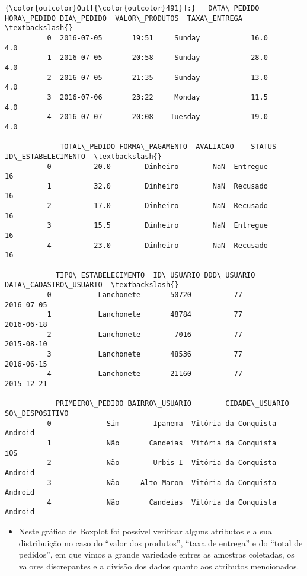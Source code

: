 \documentclass[11pt]{article}
\providecommand{\tightlist}{%
      \setlength{\itemsep}{0pt}\setlength{\parskip}{0pt}}
\begin{document}
\begin{Verbatim}[commandchars=\\\{\}]
{\color{outcolor}Out[{\color{outcolor}491}]:}   DATA\_PEDIDO HORA\_PEDIDO DIA\_PEDIDO  VALOR\_PRODUTOS  TAXA\_ENTREGA  \textbackslash{}
          0  2016-07-05       19:51     Sunday            16.0           4.0   
          1  2016-07-05       20:58     Sunday            28.0           4.0   
          2  2016-07-05       21:35     Sunday            13.0           4.0   
          3  2016-07-06       23:22     Monday            11.5           4.0   
          4  2016-07-07       20:08    Tuesday            19.0           4.0   
          
             TOTAL\_PEDIDO FORMA\_PAGAMENTO  AVALIACAO    STATUS  ID\_ESTABELECIMENTO  \textbackslash{}
          0          20.0        Dinheiro        NaN  Entregue                  16   
          1          32.0        Dinheiro        NaN  Recusado                  16   
          2          17.0        Dinheiro        NaN  Recusado                  16   
          3          15.5        Dinheiro        NaN  Entregue                  16   
          4          23.0        Dinheiro        NaN  Recusado                  16   
          
            TIPO\_ESTABELECIMENTO  ID\_USUARIO DDD\_USUARIO DATA\_CADASTRO\_USUARIO  \textbackslash{}
          0           Lanchonete       50720          77            2016-07-05   
          1           Lanchonete       48784          77            2016-06-18   
          2           Lanchonete        7016          77            2015-08-10   
          3           Lanchonete       48536          77            2016-06-15   
          4           Lanchonete       21160          77            2015-12-21   
          
            PRIMEIRO\_PEDIDO BAIRRO\_USUARIO        CIDADE\_USUARIO SO\_DISPOSITIVO  
          0             Sim        Ipanema  Vitória da Conquista        Android  
          1             Não       Candeias  Vitória da Conquista            iOS  
          2             Não        Urbis I  Vitória da Conquista        Android  
          3             Não     Alto Maron  Vitória da Conquista        Android  
          4             Não       Candeias  Vitória da Conquista        Android  
\end{Verbatim}
            
    \begin{itemize}
\tightlist
\item
  Neste gráfico de Boxplot foi possível verificar alguns atributos e a
  sua distribuição no caso do ``valor dos produtos'', ``taxa de
  entrega'' e do ``total de pedidos'', em que vimos a grande variedade
  entres as amostras coletadas, os valores discrepantes e a divisão dos
  dados quanto aos atributos mencionados.
\end{itemize}
\end{document}
